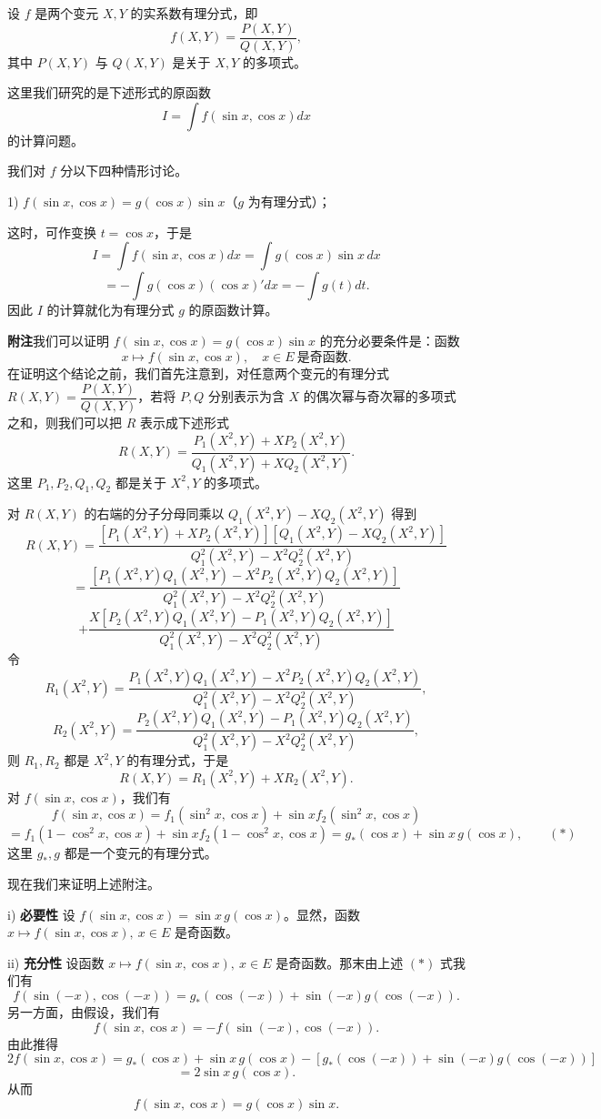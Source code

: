 设 \(f\) 是两个变元 \(X,Y\) 的实系数有理分式，即
\[
f(X,Y)=\frac{P(X,Y)}{Q(X,Y)},
\]
其中 \(P(X,Y)\) 与 \(Q(X,Y)\) 是关于 \(X,Y\) 的多项式。

这里我们研究的是下述形式的原函数
\[
I=\int f(\sin x,\cos x)dx
\]
的计算问题。

我们对 \(f\) 分以下四种情形讨论。

1) \(f(\sin x,\cos x)=g(\cos x)\sin x\)（\(g\) 为有理分式）；

这时，可作变换 \(t=\cos x\)，于是
\[
I=\int f(\sin x,\cos x)dx=\int g(\cos x)\sin x\,dx
\]
\[
=-\int g(\cos x)(\cos x)'dx=-\int g(t)dt.
\]
因此 \(I\) 的计算就化为有理分式 \(g\) 的原函数计算。

\textbf{附注}\quad 我们可以证明 \(f(\sin x,\cos x)=g(\cos x)\sin x\) 的充分必要条件是：函数
\[
x\longmapsto f(\sin x,\cos x),\quad x\in E\ \text{是奇函数}.
\]
在证明这个结论之前，我们首先注意到，对任意两个变元的有理分式 \(R(X,Y)=\dfrac{P(X,Y)}{Q(X,Y)}\)，若将 \(P,Q\) 分别表示为含 \(X\) 的偶次幂与奇次幂的多项式之和，则我们可以把 \(R\) 表示成下述形式
\[
R(X,Y)=\frac{P_1(X^2,Y)+XP_2(X^2,Y)}{Q_1(X^2,Y)+XQ_2(X^2,Y)}.
\]
这里 \(P_1,P_2,Q_1,Q_2\) 都是关于 \(X^2,Y\) 的多项式。

对 \(R(X,Y)\) 的右端的分子分母同乘以 \(Q_1(X^2,Y)-XQ_2(X^2,Y)\) 得到
\[
R(X,Y)=\frac{[P_1(X^2,Y)+XP_2(X^2,Y)][Q_1(X^2,Y)-XQ_2(X^2,Y)]}{Q_1^2(X^2,Y)-X^2Q_2^2(X^2,Y)}
\]
\[
=\frac{[P_1(X^2,Y)Q_1(X^2,Y)-X^2P_2(X^2,Y)Q_2(X^2,Y)]}{Q_1^2(X^2,Y)-X^2Q_2^2(X^2,Y)}
\]
\[
+\frac{X[P_2(X^2,Y)Q_1(X^2,Y)-P_1(X^2,Y)Q_2(X^2,Y)]}{Q_1^2(X^2,Y)-X^2Q_2^2(X^2,Y)}
\]
令
\[
R_1(X^2,Y)=\frac{P_1(X^2,Y)Q_1(X^2,Y)-X^2P_2(X^2,Y)Q_2(X^2,Y)}{Q_1^2(X^2,Y)-X^2Q_2^2(X^2,Y)},
\]
\[
R_2(X^2,Y)=\frac{P_2(X^2,Y)Q_1(X^2,Y)-P_1(X^2,Y)Q_2(X^2,Y)}{Q_1^2(X^2,Y)-X^2Q_2^2(X^2,Y)},
\]
则 \(R_1,R_2\) 都是 \(X^2,Y\) 的有理分式，于是
\[
R(X,Y)=R_1(X^2,Y)+XR_2(X^2,Y).
\]
对 \(f(\sin x,\cos x)\)，我们有
\[
f(\sin x,\cos x)=f_1(\sin^2x,\cos x)+\sin x f_2(\sin^2x,\cos x)
\]
\[
=f_1(1-\cos^2x,\cos x)+\sin x f_2(1-\cos^2x,\cos x)=g_*(\cos x)+\sin x\,g(\cos x),\qquad(*)
\]
这里 \(g_*,g\) 都是一个变元的有理分式。

现在我们来证明上述附注。

i) \textbf{必要性} 设 \(f(\sin x,\cos x)=\sin x\,g(\cos x)\)。显然，函数 \(x\longmapsto f(\sin x,\cos x),\ x\in E\) 是奇函数。

ii) \textbf{充分性} 设函数 \(x\longmapsto f(\sin x,\cos x),\ x\in E\) 是奇函数。那末由上述 \((*)\) 式我们有
\[
f(\sin(-x),\cos(-x))=g_*(\cos(-x))+\sin(-x)g(\cos(-x)).
\]
另一方面，由假设，我们有
\[
f(\sin x,\cos x)=-f(\sin(-x),\cos(-x)).
\]
由此推得
\[
2f(\sin x,\cos x)=g_*(\cos x)+\sin x\,g(\cos x)-[g_*(\cos(-x))+\sin(-x)g(\cos(-x))]
\]
\[
=2\sin x\,g(\cos x).
\]
从而
\[
f(\sin x,\cos x)=g(\cos x)\sin x.
\]

